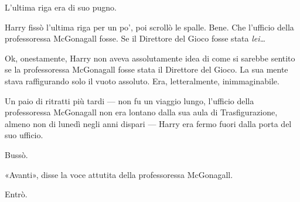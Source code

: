 L’ultima riga era di suo pugno.

Harry fissò l’ultima riga per un po’, poi scrollò le spalle. Bene. Che l’ufficio della professoressa McGonagall fosse. Se il Direttore del Gioco fosse stata \textit{lei…}

Ok, onestamente, Harry non aveva assolutamente idea di come si sarebbe sentito se la professoressa McGonagall fosse stata il Direttore del Gioco. La sua mente stava raffigurando solo il vuoto assoluto. Era, letteralmente, inimmaginabile.

Un paio di ritratti più tardi — non fu un viaggio lungo, l’ufficio della professoressa McGonagall non era lontano dalla sua aula di Trasfigurazione, almeno non di lunedì negli anni dispari — Harry era fermo fuori dalla porta del suo ufficio.

Bussò.

«Avanti», disse la voce attutita della professoressa McGonagall.

Entrò.



